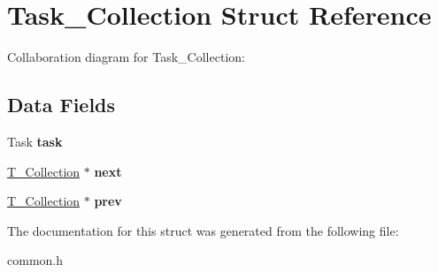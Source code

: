 \hypertarget{struct_task___collection}{}\section{Task\+\_\+\+Collection Struct Reference}
\label{struct_task___collection}


Collaboration diagram for Task\+\_\+\+Collection\+:
\subsection*{Data Fields}
\begin{DoxyCompactItemize}
\item 
Task {\bfseries task}\hypertarget{struct_task___collection_a8bcc572b9d73774627be66dd46aa61a8}{}\label{struct_task___collection_a8bcc572b9d73774627be66dd46aa61a8}

\item 
\hyperlink{struct_task___collection}{T\+\_\+\+Collection} $\ast$ {\bfseries next}\hypertarget{struct_task___collection_a41569fd5e04d2b314ceb3cf5e0eb53de}{}\label{struct_task___collection_a41569fd5e04d2b314ceb3cf5e0eb53de}

\item 
\hyperlink{struct_task___collection}{T\+\_\+\+Collection} $\ast$ {\bfseries prev}\hypertarget{struct_task___collection_a81c5e3039ce942d43d37928b5474315e}{}\label{struct_task___collection_a81c5e3039ce942d43d37928b5474315e}

\end{DoxyCompactItemize}


The documentation for this struct was generated from the following file\+:\begin{DoxyCompactItemize}
\item 
common.\+h\end{DoxyCompactItemize}
